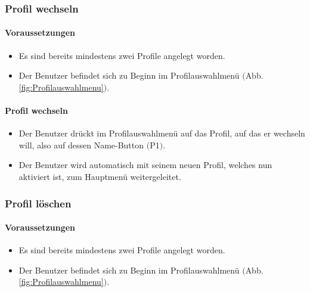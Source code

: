 \subsubsection{Profil wechseln}
\paragraph{Voraussetzungen}
\begin{itemize}
	\item Es sind bereits mindestens zwei Profile angelegt worden.
	\item Der Benutzer befindet sich zu Beginn im Profilauswahlmenü $($Abb. \ref{fig:Profilauswahlmenu}$)$.
\end{itemize}
\paragraph{Profil wechseln}
\begin{itemize}
	\item Der Benutzer drückt im Profilauswahlmenü auf das Profil, auf das er wechseln will, also auf dessen Name-Button $($P1$)$.
	\item Der Benutzer wird automatisch mit seinem neuen Profil, welches nun aktiviert ist, zum Hauptmenü weitergeleitet.
\end{itemize}

\subsubsection{Profil löschen}
\paragraph{Voraussetzungen}
\begin{itemize}
	\item Es sind bereits mindestens zwei Profile angelegt worden.
	\item Der Benutzer befindet sich zu Beginn im Profilauswahlmenü $($Abb. \ref{fig:Profilauswahlmenu}$)$.
\end{itemize}
